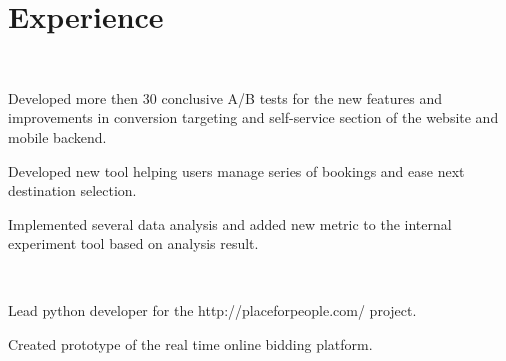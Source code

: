 \documentclass[]{hieudo-build}
\begin{document}
\begin{minipage}[t]{0.34\textwidth}

\sectionsep
{}

%
%
\end{minipage} 
\hfill
\begin{minipage}[t]{0.65\textwidth} 

\section{Experience}

\\
\vspace{0.9em} %
\begin{tightemize}
\item Developed more then 30 conclusive A/B tests for the new features and improvements in conversion targeting and self-service section of the website and mobile backend.
\item Developed new tool helping users manage series of bookings and ease next destination selection.
\item Implemented several data analysis and added new metric to the internal experiment tool based on analysis result.  
\end{tightemize}
\sectionsep

 \\
\begin{tightemize}
\item Lead python developer for the http://placeforpeople.com/ project.
\item Created prototype of the real time online bidding platform.
\end{tightemize}
\sectionsep


\end{minipage}
\end{document}
